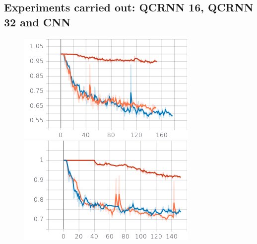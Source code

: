 \documentclass{article}
\begin{document}
    \subsection*{Experiments carried out: QCRNN 16, QCRNN 32 and CNN}
    \paragraph{}
	\begin{figure}[hbt!]
	\centering
	\begin{minipage}{0.5\textwidth}
	  \centering
	  \includegraphics[width=\linewidth]{images/sed_score_ov1.png}
	\end{minipage}%
	\begin{minipage}{.5\textwidth}
	  \centering
	  \includegraphics[width=\linewidth]{images/sed_score_ov2.png}
	\end{minipage}\\
	\vspace{1em}

\end{figure}
\end{document}
